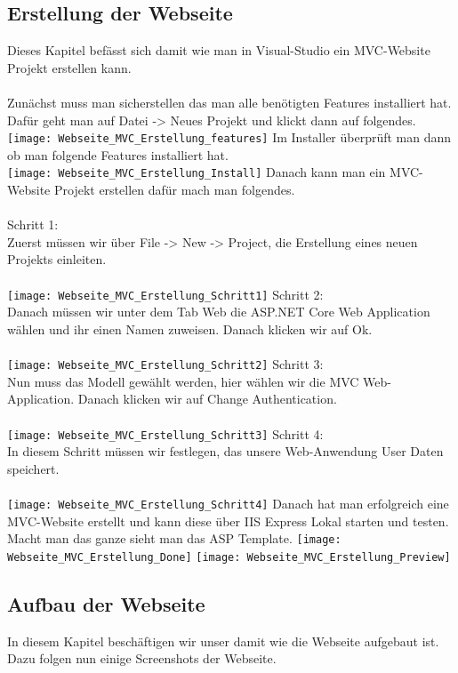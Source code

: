 {\subsection{Erstellung der Webseite}
Dieses Kapitel befässt sich damit wie man in Visual-Studio ein MVC-Website Projekt erstellen kann.\\ \\
Zunächst muss man sicherstellen das man alle benötigten Features installiert hat. Dafür geht man auf Datei -> Neues Projekt und klickt dann auf folgendes.\\
\texttt{[image: Webseite\_MVC\_Erstellung\_features]}
Im Installer überprüft man dann ob man folgende Features installiert hat.\\
\texttt{[image: Webseite\_MVC\_Erstellung\_Install]}
Danach kann man ein MVC-Website Projekt erstellen dafür mach man folgendes.\\ \\
Schritt 1:\\
Zuerst müssen wir über File -> New -> Project, die Erstellung eines neuen Projekts einleiten.\\ \\
\texttt{[image: Webseite\_MVC\_Erstellung\_Schritt1]}
Schritt 2:\\
Danach müssen wir unter dem Tab Web die ASP.NET Core Web Application wählen und ihr einen Namen zuweisen. Danach klicken wir auf Ok.\\ \\
\texttt{[image: Webseite\_MVC\_Erstellung\_Schritt2]}
Schritt 3:\\
Nun muss das Modell gewählt werden, hier wählen wir die MVC Web-Application. Danach klicken wir auf Change Authentication. \\ \\
\texttt{[image: Webseite\_MVC\_Erstellung\_Schritt3]}
Schritt 4:\\
In diesem Schritt müssen wir festlegen, das unsere Web-Anwendung User Daten speichert. \\ \\
\texttt{[image: Webseite\_MVC\_Erstellung\_Schritt4]}
Danach hat man erfolgreich eine MVC-Website erstellt und kann diese über IIS Express Lokal starten und testen. Macht man das ganze sieht man das ASP Template.
\texttt{[image: Webseite\_MVC\_Erstellung\_Done]}
\texttt{[image: Webseite\_MVC\_Erstellung\_Preview]}
\label{sec:erstellung}
\subsection{Aufbau der Webseite }
\label{sec:aufbau}
In diesem Kapitel beschäftigen wir unser damit wie die Webseite aufgebaut ist. Dazu folgen nun einige Screenshots der Webseite. 

}
